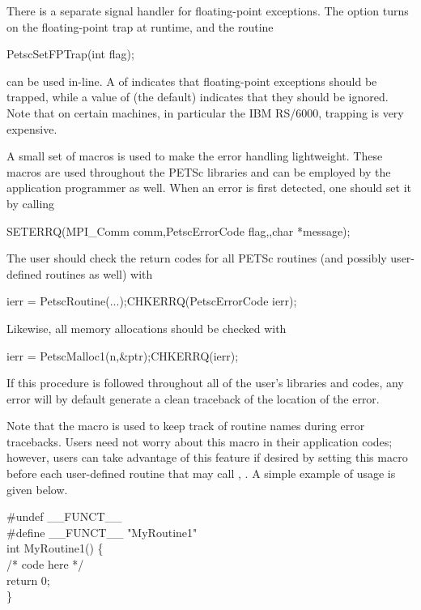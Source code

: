 {{There is a separate signal handler for floating-point exceptions.
 
The option  turns on the floating-point trap at runtime,
and the routine  
\begin{tabbing}
  PetscSetFPTrap(int flag);
\end{tabbing}
can be used in-line.
A  of  
indicates that floating-point exceptions should be trapped,
while a value of  (the default) indicates that they
should be ignored.  Note that on certain machines, in particular
the IBM RS/6000, trapping is very expensive.

A small set of macros is used to make the error handling lightweight.
These macros are used throughout the PETSc libraries and can be employed
by the application   
programmer as well.  When an error is first detected,
one should set it by calling
\begin{tabbing}
   SETERRQ(MPI\_Comm comm,PetscErrorCode flag,,char *message);
\end{tabbing}
The user should check the return codes for all PETSc routines (and
possibly user-defined routines as well) with
\begin{tabbing}
  ierr = PetscRoutine(...);CHKERRQ(PetscErrorCode ierr);
\end{tabbing}
Likewise, all memory allocations should be checked with
\begin{tabbing}
  ierr = PetscMalloc1(n,\&ptr);CHKERRQ(ierr);
\end{tabbing}
If this procedure is followed throughout all of the user's libraries
and codes, any error will by default generate a clean traceback of
the location  
of the error.

Note that the macro  is used to keep track of
routine names during error tracebacks.  Users need not worry about this
macro in their application codes; however, users can take advantage of this feature
if desired by setting this macro before each user-defined routine
that may call , .
A simple example of usage is given below.
\begin{tabbing}
    \#undef \_\_FUNCT\_\_  \\
    \#define \_\_FUNCT\_\_ "MyRoutine1"\\
    int MyRoutine1() \{ \\
        /* code here */\\
        return 0;\\
    \}
\end{tabbing}

}}
